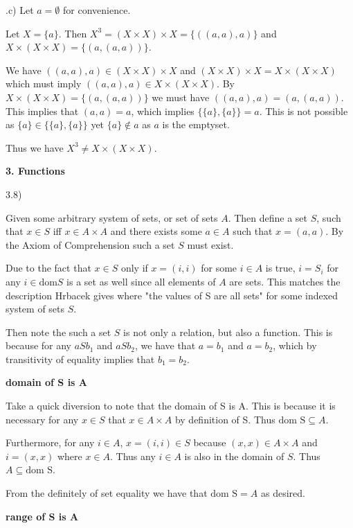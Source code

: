\documentclass{article}
\begin{document}
.c)
Let $a = \emptyset$ for convenience.

\medskip
Let $X = \{a\}$. Then $X^{3} = (X \times X) \times X = \{((a,a),a)\}$ and $X \times (X \times X) = \{(a,(a,a))\}$. 

\medskip
We have $((a,a),a) \in (X \times X) \times X$ and $(X \times X) \times X = X \times (X \times X)$ which must imply $((a,a),a) \in X \times (X \times X)$. By $X \times (X \times X) = \{(a,(a,a))\}$ we must have $((a,a),a) = (a,(a,a))$. This implies that $(a,a) = a$, which implies $\{\{a\},\{a\}\} = a$. This is not possible as $\{a\} \in \{\{a\},\{a\}\}$ yet $\{a\} \notin a$ as $a$ is the emptyset.

\medskip
Thus we have $X^{3} \neq X \times (X \times X)$.

\medskip
\textbf{3. Functions}
\medskip
 
3.8)

Given some arbitrary system of sets, or set of sets $A$. Then define a set $S$, such that $x \in S$ iff $x \in A \times A$ and there exists some $a \in A$ such that $x = (a,a)$. By the Axiom of Comprehension such a set $S$ must exist.

\medskip

Due to the fact that $x \in S$ only if $x = (i,i)$ for some $i \in A$ is true, $i = S_i$ for any $i \in \text{dom} S$ is a set as well since all elements of $A$ are sets. This matches the description Hrbacek gives where "the values of S are all sets" for some indexed system of sets $S$. 

\medskip

Then note the such a set $S$ is not only a relation, but also a function. This is because for any $aSb_1$ and $aSb_2$, we have that $a = b_1$ and $a = b_2$, which by transitivity of equality implies that $b_1 = b_2$. 

\medskip
\textbf{domain of S is A}
\medskip

Take a quick diversion to note that the domain of S is A. This is because it is necessary for any $x \in S$ that $x \in A \times A$ by definition of S. Thus $\text{dom S} \subseteq A$.

Furthermore, for any $i \in A$, $x = (i,i) \in S$ because $(x,x) \in A \times A$ and $i = (x,x)$ where $x \in A$. Thus any $i \in A$ is also in the domain of $S$. Thus $A \subseteq \text{dom S}$.

\medskip
From the definitely of set equality we have that $\text{dom S} = A$ as desired.

\medskip
\textbf{range of S is A}
\medskip
\end{document}
